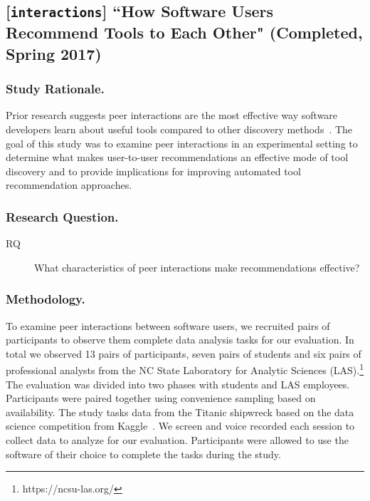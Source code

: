 \documentclass[runningheads]{llncs}
\begin{document}
\subsection{[\texttt{interactions}] ``How Software Users Recommend Tools to Each Other" (Completed, Spring 2017)}

\subsubsection{Study Rationale.}

Prior research suggests peer interactions are the most effective way software developers learn about useful tools compared to other discovery methods~\cite{Murphy-Hill2015HowDoUsers,Murphy-Hill2011PeerInteraction}. The goal of this study was to examine peer interactions in an experimental setting to determine what makes user-to-user recommendations an effective mode of tool discovery and to provide implications for improving automated tool recommendation approaches.

\subsubsection{Research Question.}

\begin{description}
  \item[RQ] What characteristics of peer interactions make recommendations effective?
\end{description}

\subsubsection{Methodology.}

To examine peer interactions between software users, we recruited pairs of participants to observe them complete data analysis tasks for our evaluation. In total we observed 13 pairs of participants, seven pairs of students and six pairs of professional analysts from the NC State Laboratory for Analytic Sciences (LAS).\footnote{https://ncsu-las.org/} The evaluation was divided into two phases with students and LAS employees. Participants were paired together using convenience sampling based on availability. The study tasks data from the Titanic shipwreck based on the data science competition from Kaggle~\cite{KaggleTitanic}. We screen and voice recorded each session to collect data to analyze for our evaluation. Participants were allowed to use the software of their choice to complete the tasks during the study.
\end{document}

